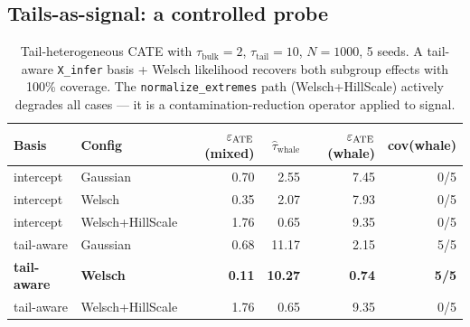 \subsection{Tails-as-signal: a controlled probe}
\label{sec:experiments:tail_signal}
\begin{table}[!t]
\centering
\small
\begin{tabular}{llrrrr}
\toprule
Basis & Config & $\varepsilon_{\mathrm{ATE}}$ (mixed) & $\hat\tau_{\text{whale}}$
      & $\varepsilon_{\mathrm{ATE}}$ (whale) & cov(whale) \\
\midrule
intercept  & Gaussian    & 0.70 & 2.55  & 7.45 & 0/5 \\
intercept  & Welsch      & 0.35 & 2.07  & 7.93 & 0/5 \\
intercept  & Welsch+HillScale  & 1.76 & 0.65  & 9.35 & 0/5 \\
\midrule
tail-aware & Gaussian    & 0.68 & 11.17 & 2.15 & 5/5 \\
\textbf{tail-aware} & \textbf{Welsch} & \textbf{0.11} & \textbf{10.27} & \textbf{0.74} & \textbf{5/5} \\
tail-aware & Welsch+HillScale  & 1.76 & 0.65  & 9.35 & 0/5 \\
\bottomrule
\end{tabular}
\caption{Tail-heterogeneous CATE with $\tau_{\text{bulk}} = 2$,
$\tau_{\text{tail}} = 10$, $N = 1000$, 5 seeds. A tail-aware
\texttt{X\_infer} basis + Welsch likelihood recovers both subgroup
effects with 100\% coverage. The \texttt{normalize\_extremes} path
(Welsch+HillScale) actively degrades all cases --- it is a
contamination-reduction operator applied to signal.}
\label{tab:tail_signal}
\end{table}

